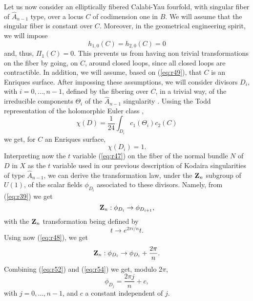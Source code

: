 Let us now consider an elliptically fibered Calabi-Yau fourfold, with 
singular fiber of $\hat{A}_{n-1}$ type, over a locus $C$ of codimension 
one in $B$. We will assume that the singular fiber is constant over $C$. Moreover, 
in the geometrical engineering spirit, we will impose
\begin{equation}
h_{1,0}(C)=h_{2,0}(C)=0
\label{eq:r49}
\end{equation}
and, thus, $\Pi_1(C)=0$. This prevents us from having non trivial transformations 
on the fiber by going, on $C$, around closed loops, since all closed loops 
are contractible. In addition, we will assume, based on (\ref{eq:r49}), 
that $C$ is an Enriques surface. After impossing these assumptions, we will 
consider divisors $D_i$, with $i=0, \ldots, n-1$, defined by the fibering over 
$C$, in a trivial way, of the irreducible components $\Theta_i$ of the 
$\hat{A}_{n-1}$ singularity \cite{KV}. Ussing the Todd representation of the holomorphic 
Euler class \cite{Fulton},
\begin{equation}
\chi(D) = \frac {1}{24} \int_{D_i} c_1 (\Theta_i) c_2(C)
\label{eq:r50}
\end{equation}
we get, for $C$ an Enriques surface,
\begin{equation}
\chi(D_i) =1.
\label{eq:r51}
\end{equation}
Interpreting now the $t$ variable (\ref{eq:r47}) on the fiber of the normal 
bundle $N$ of $D$ in $X$ as the $t$ variable used in our previous 
description of Kodaira singularities of type $\hat{A}_{n-1}$, we can derive the 
transformation law, under the ${\bf Z}_n$ subgroup of $U(1)$, of the scalar 
fields $\phi_{D_i}$ associated to these divisors. Namely, from (\ref{eq:r39}) 
we get
\begin{equation}
{\bf Z}_n: \phi_{D_i} \rightarrow \phi_{D_{i+1}},
\label{eq:r52}
\end{equation}
with the ${\bf Z}_n$ transformation being defined by
\begin{equation}
t \rightarrow e^{2 \pi i/n}t.
\label{eq:r53}
\end{equation}
Using now (\ref{eq:r48}), we get
\begin{equation}
{\bf Z}_n : \phi_{D_i} \rightarrow \phi_{D_i} + \frac {2 \pi}{n}.
\label{eq:r54}
\end{equation}
Combining (\ref{eq:r52}) and (\ref{eq:r54}) we get, modulo $2 \pi$,
\begin{equation}
\phi_{D_j} = \frac {2 \pi j}{n} + c,
\label{eq:r55}
\end{equation}
with $j=0,\ldots,n-1$, and $c$ a constant independent of $j$.
  
